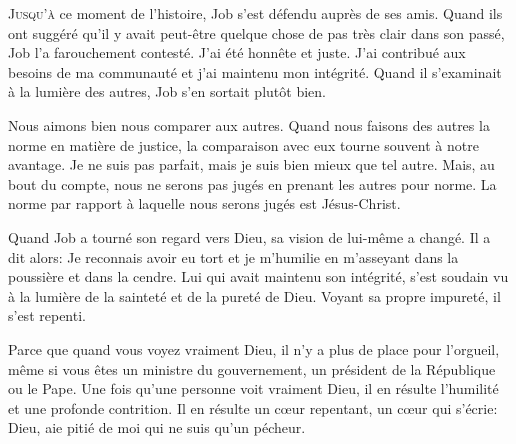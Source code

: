 



\lettrine{J}{usqu'à} ce moment de l'histoire,
 Job s'est défendu auprès de ses amis.
 Quand ils ont suggéré qu'il y avait peut-être quelque chose
 de pas très clair dans son passé, Job l'a farouchement contesté.
 \Og J'ai été honnête et juste. J'ai contribué aux besoins de ma communauté
 et j'ai maintenu mon intégrité. \Fg{}
 Quand il s'examinait à la lumière des autres, Job s'en sortait plutôt bien.

Nous aimons bien nous comparer aux autres.
 Quand nous faisons des autres la norme en matière de justice,
 la comparaison avec eux tourne souvent à notre avantage.
 \Og Je ne suis pas parfait, mais je suis bien mieux que tel autre. \Fg{}
 Mais, au bout du compte, nous ne serons pas jugés en prenant
 les autres pour norme.
 La norme par rapport à laquelle nous serons jugés est Jésus-Christ.

Quand Job a tourné son regard vers Dieu, sa vision de lui-même a changé.
 Il a dit alors: \Og Je reconnais avoir eu tort et je m'humilie en m'asseyant
 dans la poussière et dans la cendre. \Fg{}
 Lui qui avait maintenu son intégrité, s'est soudain vu à la lumière
 de la sainteté et de la pureté de Dieu.
 Voyant sa propre impureté, il s'est repenti.


Parce que quand vous voyez vraiment Dieu,
 il n'y a plus de place pour l'orgueil,
 même si vous êtes un ministre du gouvernement,
 un président de la République ou le Pape.
 Une fois qu'une personne voit vraiment Dieu,
 il en résulte l'humilité et une profonde contrition.
 Il en résulte un c\oe{}ur repentant,
 un c\oe{}ur qui s'écrie:
 \Og Dieu, aie pitié de moi qui ne suis qu'un pécheur. \Fg{}

\dvrule



